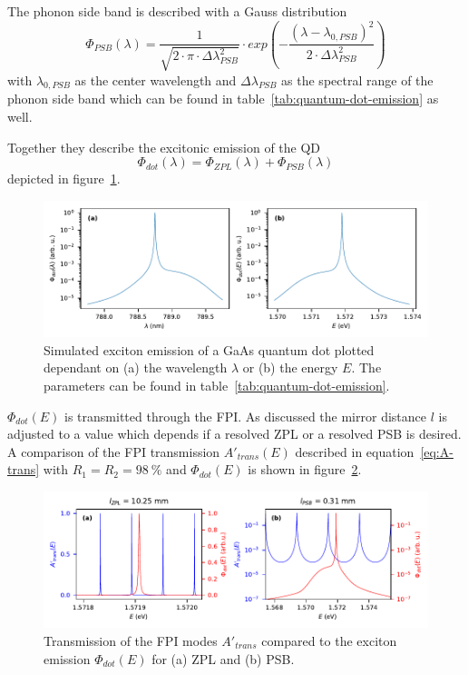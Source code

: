 The phonon side band is described with a Gauss distribution
\begin{equation}
\Phi_{PSB}(\lambda) = \frac{1}{\sqrt{2\cdot\pi\cdot \Delta\lambda_{PSB}^2}}\cdot exp\left(-\frac{(\lambda - \lambda_{0, PSB})^2}{2\cdot \Delta\lambda_{PSB}^2}\right)
\end{equation}
with $\lambda_{0, PSB}$ as the center wavelength and $\Delta\lambda_{PSB}$ as the spectral range of the phonon side band which can be found in table~\ref{tab:quantum-dot-emission} as well.

Together they describe the excitonic emission of the \ac{QD}
\begin{equation}
\Phi_{dot}(\lambda) = \Phi_{ZPL}(\lambda) + \Phi_{PSB}(\lambda)
\end{equation}
depicted in figure~\ref{fig:quantumdotemissionwavelengthenergy}.

\begin{figure}[H]
	\centering
	\includegraphics{figures/fabry-perot/plots/quantum_dot_emission_wavelength_energy}
	\caption[Simulated exciton emission of a GaAs quantum dot]{Simulated exciton emission of a GaAs quantum dot plotted dependant on (a) the wavelength $\lambda$ or (b) the energy $E$.
		The parameters can be found in table~\ref{tab:quantum-dot-emission}.}
	\label{fig:quantumdotemissionwavelengthenergy}
\end{figure}

$\Phi_{dot}(E)$ is transmitted through the \ac{FPI}.
As discussed the mirror distance $l$ is adjusted to a value which depends if a resolved \ac{ZPL} or a resolved \ac{PSB} is desired.
A comparison of the \ac{FPI} transmission $A'_{trans}(E)$ described in equation~\ref{eq:A-trans} with $R_1=R_2=\SI{98}{\percent}$ and $\Phi_{dot}(E)$ is shown in figure~\ref{fig:simulation-comparison-dot-fabry-perot-modes}.
\begin{figure}[H]
	\centering
	\includegraphics[width=\linewidth]{figures/fabry-perot/plots/simulation-comparison-dot-fabry-perot-modes}
	\caption{Transmission of the FPI modes $A'_{trans}$ compared to the exciton emission $\Phi_{dot}(E)$ for (a) ZPL and (b) PSB.}
	\label{fig:simulation-comparison-dot-fabry-perot-modes}
\end{figure}


